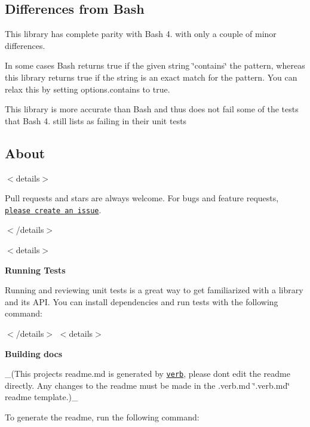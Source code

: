 \subsection*{Differences from Bash}

This library has complete parity with Bash 4. with only a couple of minor differences.


\begin{DoxyItemize}
\item In some cases Bash returns true if the given string \char`\"{}contains\char`\"{} the pattern, whereas this library returns true if the string is an exact match for the pattern. You can relax this by setting {\ttfamily options.\+contains} to true.
\item This library is more accurate than Bash and thus does not fail some of the tests that Bash 4. still lists as failing in their unit tests
\end{DoxyItemize}

\subsection*{About}

$<$details$>$

Pull requests and stars are always welcome. For bugs and feature requests, \href{../../issues/new}{\tt please create an issue}.

$<$/details$>$

$<$details$>$ 

{\bfseries Running Tests}

Running and reviewing unit tests is a great way to get familiarized with a library and its A\+PI. You can install dependencies and run tests with the following command\+:




$<$/details$>$ $<$details$>$ 

{\bfseries Building docs}

\+\_\+(This project\textquotesingle{}s readme.\+md is generated by \href{https://github.com/verbose/verb-generate-readme}{\tt verb}, please don\textquotesingle{}t edit the readme directly. Any changes to the readme must be made in the .verb.\+md \char`\"{}.\+verb.\+md\char`\"{} readme template.)\+\_\+

To generate the readme, run the following command\+:


